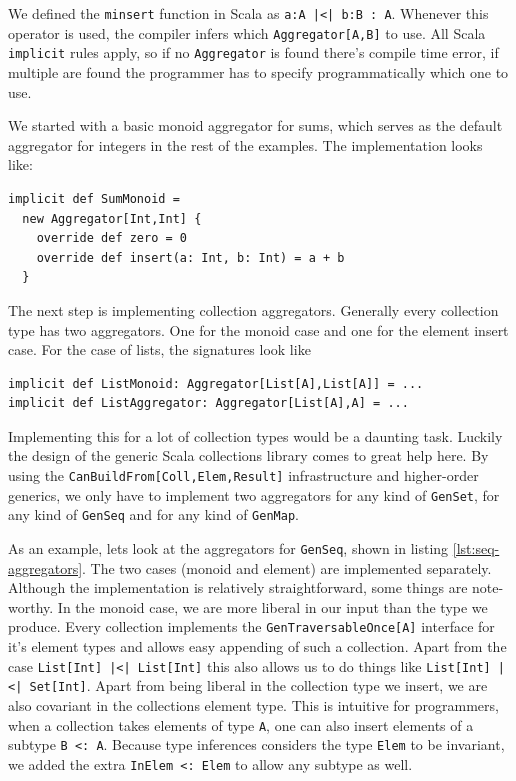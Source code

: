 \documentclass[10pt,a4paper]{article}
\begin{document}
We defined the \lstinline[language=haskell]|minsert| function in Scala as \lstinline!a:A |<| b:B : A!. Whenever this operator is used, the compiler infers which \lstinline|Aggregator[A,B]| to use. All Scala \lstinline|implicit| rules apply, so if no \lstinline|Aggregator| is found there's compile time error, if multiple are found the programmer has to specify programmatically which one to use.

We started with a basic monoid aggregator for sums, which serves as the default aggregator for integers in the rest of the examples. The implementation looks like:
\begin{lstlisting}
implicit def SumMonoid =
  new Aggregator[Int,Int] {
    override def zero = 0
    override def insert(a: Int, b: Int) = a + b
  }
\end{lstlisting}

The next step is implementing collection aggregators. Generally every collection type has two aggregators. One for the monoid case and one for the element insert case. For the case of lists, the signatures look like
\begin{lstlisting}
implicit def ListMonoid: Aggregator[List[A],List[A]] = ...
implicit def ListAggregator: Aggregator[List[A],A] = ...
\end{lstlisting}

Implementing this for a lot of collection types would be a daunting task. Luckily the design of the generic Scala collections library \citep{odersky2009fighting} comes to great help here. By using the \lstinline|CanBuildFrom[Coll,Elem,Result]| infrastructure and higher-order generics, we only have to implement two aggregators for any kind of \lstinline|GenSet|, for any kind of \lstinline|GenSeq| and for any kind of \lstinline|GenMap|.

As an example, lets look at the aggregators for \lstinline|GenSeq|, shown in listing \ref{lst:seq-aggregators}. The two cases (monoid and element) are implemented separately. Although the implementation is relatively straightforward, some things are note-worthy. In the monoid case, we are more liberal in our input than the type we produce. Every collection implements the \lstinline|GenTraversableOnce[A]| interface for it's element types and allows easy appending of such a collection. Apart from the case \lstinline!List[Int] |<| List[Int]! this also allows us to do things like \lstinline!List[Int] |<| Set[Int]!. Apart from being liberal in the collection type we insert, we are also covariant in the collections element type. This is intuitive for programmers, when a collection takes elements of type \lstinline|A|, one can also insert elements of a subtype \lstinline|B <: A|. Because type inferences considers the type \lstinline|Elem| to be invariant, we added the extra \lstinline|InElem <: Elem| to allow any subtype as well.
\end{document}
